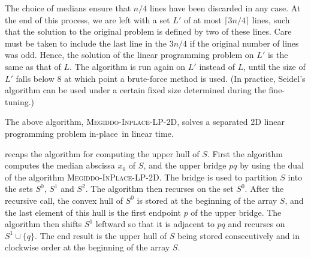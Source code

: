 \documentclass{elsart}
\newcommand{\inplace}{in-place}
\begin{document}
The choice of medians ensure that $n/4$ lines have been discarded in
any case.  At the end of this process, we are left with a set $L'$ of
at most $\lceil 3n/4 \rceil$ lines, such that the solution to the
original problem is defined by two of these lines.  Care must be taken
to include the last line in the $3n/4$ if the original number of lines
was odd.  Hence, the solution of the linear programming problem on
$L'$ is the same as that of $L$. The algorithm is run again on $L'$
instead of $L$, until the size of $L'$ falls below 8 at which point a
brute-force method is used.  (In practice, Seidel's algorithm can be
used under a certain fixed size determined during the fine-tuning.)

\begin{thm}
The above algorithm, \textsc{Megiddo-Inplace-LP-2D}, solves a
separated 2D linear programming problem \inplace\ in linear time.
\end{thm}

 recaps the algorithm for computing the upper hull of $S$.
First the algorithm computes the median abscissa $x_0$ of $S$, and the
upper bridge $pq$ by using the dual of the algorithm
\textsc{Megiddo-InPlace-LP-2D}. The bridge is used to partition $S$
into the sets $S^0$, $S^1$ and $S^2$.  The algorithm then recurses on
the set $S^0$.  After the recursive call, the convex hull of $S^0$ is
stored at the beginning of the array $S$, and the last element of this
hull is the first endpoint $p$ of the upper bridge.  The algorithm
then shifts $S^1$ leftward so that it is adjacent to $pq$ and recurses
on $S^1\cup\{q\}$.  The end result is the upper hull of $S$ being
stored consecutively and in clockwise order at the beginning of the
array $S$.
\end{document}
